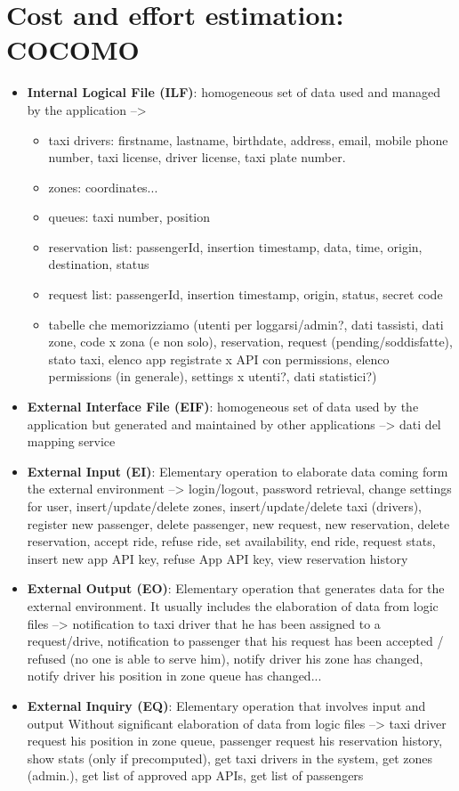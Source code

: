 \section{Cost and effort estimation: COCOMO}
\begin{itemize}
\item \textbf{Internal Logical File (ILF)}:
homogeneous set of data used and managed by the application --> 
\begin{itemize}
\item taxi drivers: firstname, lastname, birthdate, address, email, mobile phone number, taxi license, driver license, taxi plate number.
\item zones: coordinates...
\item queues: taxi number, position
\item reservation list: passengerId, insertion timestamp, data, time, origin, destination, status
\item request list: passengerId, insertion timestamp, origin, status, secret code
\item 
tabelle che memorizziamo (utenti per loggarsi/admin?, dati tassisti, dati zone, code x zona (e non solo), reservation, request (pending/soddisfatte), stato taxi, elenco app registrate x API con permissions, elenco permissions (in generale), settings x utenti?, dati statistici?) 
\end{itemize}

\item \textbf{External Interface File (EIF)}: homogeneous set of data used by the application but generated and maintained by other applications --> 
dati del mapping service

\item \textbf{External Input (EI)}:
Elementary operation to elaborate data coming form the external environment --> 
login/logout, password retrieval, change settings for user, insert/update/delete zones, insert/update/delete taxi (drivers), register new passenger, delete passenger, new request, new reservation, delete reservation, accept ride, refuse ride, set availability, end ride, request stats, insert new app API key, refuse App API key, view reservation history

\item \textbf{External Output (EO)}:
Elementary operation that generates data for the external environment. It usually includes the elaboration of data from logic files -->
notification to taxi driver that he has been assigned to a request/drive, notification to passenger that his request has been accepted / refused (no one is able to serve him), notify driver his zone has changed, notify driver his position in zone queue has changed... 

\item \textbf{External Inquiry (EQ)}:
Elementary operation that involves input and output Without significant elaboration of data from logic files -->
taxi driver request his position in zone queue, passenger request his reservation history, show stats (only if precomputed), get taxi drivers in the system, get zones (admin.), get list of approved app APIs, get list of passengers

\end{itemize}
